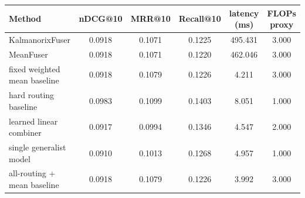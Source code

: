 \begin{tabular}{lccccc}
\toprule
Method & nDCG@10 & MRR@10 & Recall@10 & latency (ms) & FLOPs proxy \\
\midrule
KalmanorixFuser & 0.0918 & 0.1071 & 0.1225 & 495.431 & 3.000 \\
MeanFuser & 0.0918 & 0.1071 & 0.1220 & 462.046 & 3.000 \\
fixed weighted mean baseline & 0.0918 & 0.1079 & 0.1226 & 4.211 & 3.000 \\
hard routing baseline & 0.0983 & 0.1099 & 0.1403 & 8.051 & 1.000 \\
learned linear combiner & 0.0917 & 0.0994 & 0.1346 & 4.547 & 2.000 \\
single generalist model & 0.0910 & 0.1013 & 0.1268 & 4.957 & 1.000 \\
all-routing + mean baseline & 0.0918 & 0.1079 & 0.1226 & 3.992 & 3.000 \\
\bottomrule
\end{tabular}
